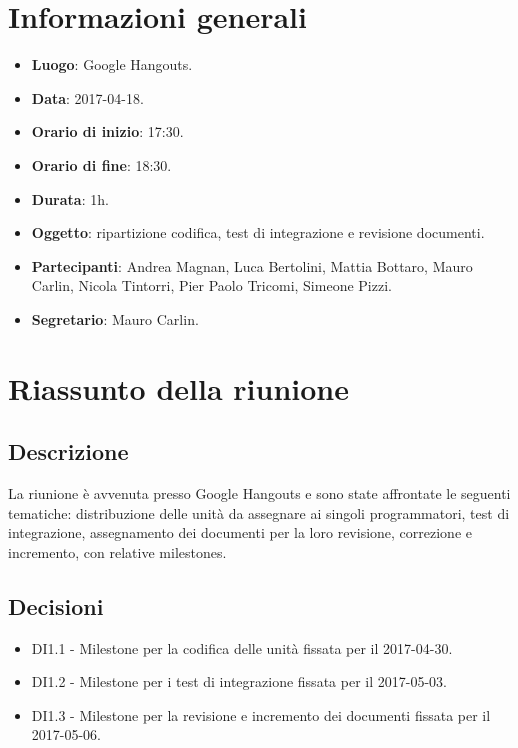 \documentclass[a4paper,titlepage]{article}
\begin{document}
\maketitle
\begin{diario}
\end{diario}
\newpage
\tableofcontents

\newpage
\section{Informazioni generali}
\label{sec:Informazioni}

\begin{itemize}
  \item \textbf{Luogo}: Google Hangouts.
  \item \textbf{Data}: 2017-04-18.
  \item \textbf{Orario di inizio}: 17:30.
  \item \textbf{Orario di fine}: 18:30.
  \item \textbf{Durata}: 1h.
  \item \textbf{Oggetto}: ripartizione codifica, test di integrazione e revisione documenti.
  \item \textbf{Partecipanti}: Andrea Magnan, Luca Bertolini, Mattia Bottaro, Mauro Carlin, Nicola Tintorri, Pier Paolo Tricomi, Simeone Pizzi.
  \item \textbf{Segretario}: Mauro Carlin.

\end{itemize}
\section{Riassunto della riunione}
\label{sec:RiassuntoRiunione}
 \subsection{Descrizione}
La riunione è avvenuta presso Google Hangouts e sono state affrontate le seguenti tematiche: distribuzione delle unità da assegnare ai singoli programmatori, test di integrazione, assegnamento dei documenti per la loro revisione, correzione e incremento, con relative milestones.
 \subsection{Decisioni}
 \begin{itemize}
  \item DI1.1 - Milestone per la codifica delle unità fissata per il 2017-04-30.
  \item DI1.2 - Milestone per i test di integrazione fissata per il 2017-05-03.  
  \item DI1.3 - Milestone per la revisione e incremento dei documenti fissata per il 2017-05-06.
 \end{itemize}
\end{document}

